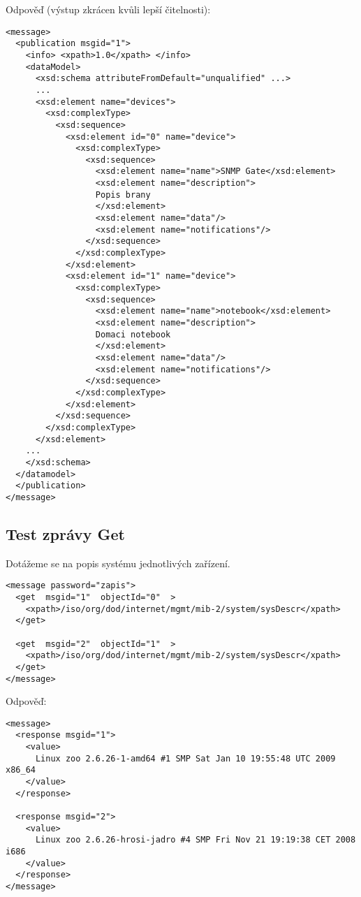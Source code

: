 \newpage
Odpověď (výstup zkrácen kvůli lepší čitelnosti):
\begin{verbatim}
<message>
  <publication msgid="1">
    <info> <xpath>1.0</xpath> </info>
    <dataModel>
      <xsd:schema attributeFromDefault="unqualified" ...>
	  ...
      <xsd:element name="devices">
        <xsd:complexType>
          <xsd:sequence>
            <xsd:element id="0" name="device">
              <xsd:complexType>
                <xsd:sequence>
                  <xsd:element name="name">SNMP Gate</xsd:element>
                  <xsd:element name="description">
                  Popis brany
                  </xsd:element>
                  <xsd:element name="data"/>
                  <xsd:element name="notifications"/>
                </xsd:sequence>
              </xsd:complexType>
            </xsd:element>
            <xsd:element id="1" name="device">
              <xsd:complexType>
                <xsd:sequence>
                  <xsd:element name="name">notebook</xsd:element>
                  <xsd:element name="description">
                  Domaci notebook
                  </xsd:element>
                  <xsd:element name="data"/>
                  <xsd:element name="notifications"/>
                </xsd:sequence>
              </xsd:complexType>
            </xsd:element>
          </xsd:sequence>
        </xsd:complexType>
      </xsd:element>
    ...
    </xsd:schema>
  </datamodel>
  </publication>
</message>
\end{verbatim}
\newpage

\subsection*{Test zprávy Get}
Dotážeme se na popis systému jednotlivých zařízení.
\begin{verbatim}
<message password="zapis">
  <get  msgid="1"  objectId="0"  > 
    <xpath>/iso/org/dod/internet/mgmt/mib-2/system/sysDescr</xpath>
  </get>

  <get  msgid="2"  objectId="1"  > 
    <xpath>/iso/org/dod/internet/mgmt/mib-2/system/sysDescr</xpath>
  </get>
</message>
\end{verbatim}

Odpověď:
\begin{verbatim}
<message>
  <response msgid="1">
    <value>
      Linux zoo 2.6.26-1-amd64 #1 SMP Sat Jan 10 19:55:48 UTC 2009 x86_64
    </value>
  </response>

  <response msgid="2">
    <value>
      Linux zoo 2.6.26-hrosi-jadro #4 SMP Fri Nov 21 19:19:38 CET 2008 i686
    </value>
  </response>
</message>
\end{verbatim}

